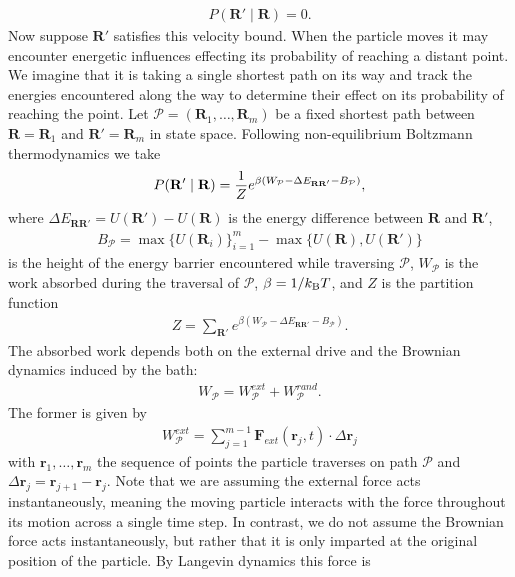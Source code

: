 \documentclass[12pt,letterpaper]{article}
\newcommand{\B}{\textnormal{B}}
\newcommand{\mb}{\mathbf}
\newcommand{\mc}{\mathcal}
\begin{document}
\begin{itemize}
\begin{align*}
P(\mb{R}' \mid \mb{R}) = 0.
\end{align*}
Now suppose $\mb{R}'$ satisfies this velocity bound. When the particle moves it may encounter energetic influences effecting its probability of reaching a distant point. We imagine that it is taking a single shortest path on its way and track the energies encountered along the way to determine their effect on its probability of reaching the point. Let $\mc{P} = (\mb{R}_{1}, \ldots, \mb{R}_{m})$ be a fixed shortest path between $\mb{R} = \mb{R}_{1}$ and $\mb{R}' = \mb{R}_{m}$ in state space. Following non-equilibrium Boltzmann thermodynamics we take
\begin{align}
\label{transition_prob_eq}
P(\mb{R}' \mid \mb{R}) = {1 \over Z}e^{\beta(W_{\mc{P}} - \Delta E_{\mb{R}\mb{R}'} - B_{\mc{P}})},
\end{align}
where $\Delta E_{\mb{R}\mb{R}'} = U(\mb{R}') - U(\mb{R})$ is the energy difference between $\mb{R}$ and $\mb{R}'$,
\begin{align*}
B_{\mc{P}} = \max\{U(\mb{R}_{i})\}_{i=1}^{m} - \max\{U(\mb{R}), U(\mb{R}')\}
\end{align*}
is the height of the energy barrier encountered while traversing $\mc{P}$, $W_{\mc{P}}$ is the work absorbed during the traversal of $\mc{P}$, $\beta = 1/k_{\B}T$, and $Z$ is the partition function
\begin{align*}
Z = \sum_{\mb{R}'}e^{\beta(W_{\mc{P}} - \Delta E_{\mb{R}\mb{R}'} - B_{\mc{P}})}.
\end{align*}
The absorbed work depends both on the external drive and the Brownian dynamics induced by the bath:
\begin{align*}
W_{\mc{P}} = W^{ext}_{\mc{P}} + W^{rand}_{\mc{P}}.
\end{align*}
The former is given by
\begin{align*}
W^{ext}_{\mc{P}} = \sum_{j=1}^{m-1}\mb{F}_{ext}(\mb{r}_{j}, t) \cdot \Delta\mathbf{r}_{j}
\end{align*}
with $\mb{r}_{1}, \ldots, \mb{r}_{m}$ the sequence of points the particle traverses on path $\mc{P}$ and $\Delta \mb{r}_{j} = \mb{r}_{j+1} - \mb{r}_{j}$. Note that we are assuming the external force acts instantaneously, meaning the moving particle interacts with the force throughout its motion across a single time step. In contrast, we do not assume the Brownian force acts instantaneously, but rather that it is only imparted at the original position of the particle. By Langevin dynamics this force is
\begin{align*}

\end{align*}
\end{itemize}
\end{document}
